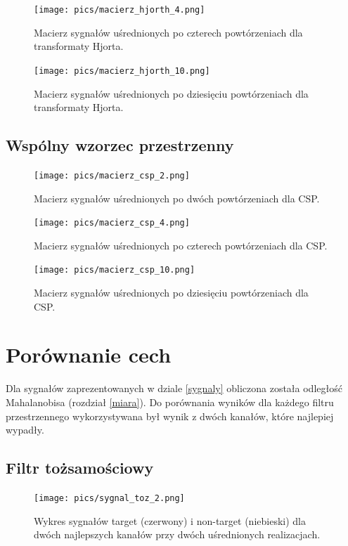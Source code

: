 \documentclass[licencjacka,openright]{pracamgr}
\begin{document}
\begin{figure}[H]
\centering
\texttt{[image: pics/macierz\_hjorth\_4.png]}
\caption{Macierz sygnałów uśrednionych po czterech powtórzeniach dla transformaty Hjorta.}
\label{maciez_hjorth_4}
\end{figure}

\begin{figure}[H]
\centering
\texttt{[image: pics/macierz\_hjorth\_10.png]}
\caption{Macierz sygnałów uśrednionych po dziesięciu powtórzeniach dla transformaty Hjorta.}
\label{maciez_hjorth_10}
\end{figure}

\subsection{Wspólny wzorzec przestrzenny}

\begin{figure}[H]
\centering
\texttt{[image: pics/macierz\_csp\_2.png]}
\caption{Macierz sygnałów uśrednionych po dwóch powtórzeniach dla CSP.}
\label{maciez_csp_2}
\end{figure}

\begin{figure}[H]
\centering
\texttt{[image: pics/macierz\_csp\_4.png]}
\caption{Macierz sygnałów uśrednionych po czterech powtórzeniach dla CSP.}
\label{maciez_csp_4}
\end{figure}

\begin{figure}[H]
\centering
\texttt{[image: pics/macierz\_csp\_10.png]}
\caption{Macierz sygnałów uśrednionych po dziesięciu powtórzeniach dla CSP.}
\label{maciez_csp_10}
\end{figure}


\section{Porównanie cech}
Dla sygnałów zaprezentowanych w dziale \ref{sygnaly} obliczona została odległość Mahalanobisa (rozdział \ref{miara}). Do porównania wyników dla każdego filtru przestrzennego wykorzystywana był wynik z dwóch kanałów, które najlepiej wypadły. 

\subsection{Filtr tożsamościowy}

\begin{figure}[H]
\centering
\texttt{[image: pics/sygnal\_toz\_2.png]}
\caption{Wykres sygnałów target (czerwony) i non-target (niebieski) dla dwóch najlepszych kanałów przy dwóch uśrednionych realizacjach.}
\label{sygnal_toz_2}
\end{figure}
\end{document}
